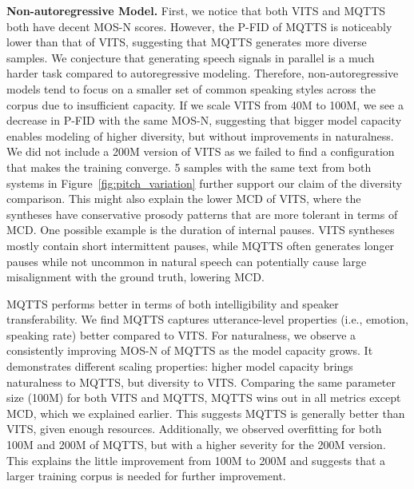\documentclass[letterpaper]{article} %
\begin{document}
\textbf{Non-autoregressive Model.}
First, we notice that both VITS and MQTTS both have decent MOS-N scores.
However, the P-FID of MQTTS is noticeably lower than that of VITS, suggesting that MQTTS generates more diverse samples.
We conjecture that generating speech signals in parallel is a much harder task compared to autoregressive modeling.
Therefore, non-autoregressive models tend to focus on a smaller set of common speaking styles across the corpus due to insufficient capacity.
If we scale VITS from 40M to 100M, we see a decrease in P-FID with the same MOS-N, suggesting that bigger model capacity enables modeling of higher diversity, but without improvements in naturalness.
We did not include a 200M version of VITS as we failed to find a configuration that makes the training converge.
5 samples with the same text from both systems in Figure~\ref{fig:pitch_variation} further support our claim of the diversity comparison.
This might also explain the lower MCD of VITS, where the syntheses have conservative prosody patterns that are more tolerant in terms of MCD.
One possible example is the duration of internal pauses.
VITS syntheses mostly contain short intermittent pauses, while MQTTS often generates longer pauses while not uncommon in natural speech can potentially cause large misalignment with the ground truth, lowering MCD.

MQTTS performs better in terms of both intelligibility and speaker transferability.
We find MQTTS captures utterance-level properties (i.e., emotion, speaking rate) better compared to VITS.
For naturalness, we observe a consistently improving MOS-N of MQTTS as the model capacity grows.
It demonstrates different scaling properties: higher model capacity brings naturalness to MQTTS, but diversity to VITS.
Comparing the same parameter size (100M) for both VITS and MQTTS, MQTTS wins out in all metrics except MCD, which we explained earlier.
This suggests MQTTS is generally better than VITS, given enough resources.
Additionally, we observed overfitting for both 100M and 200M of MQTTS, but with a higher severity for the 200M version.
This explains the little improvement from 100M to 200M and suggests that a larger training corpus is needed for further improvement.
\end{document}
